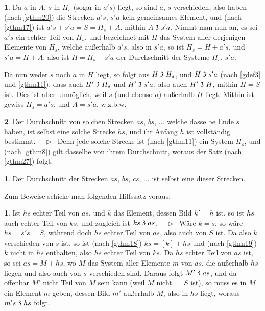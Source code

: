 \documentclass[leqno,hidelinks,10pt]{article}
\theoremstyle{definition}
\newtheorem{satz}{\protect\satzname}
\newtheorem*{zusatz}{\protect\zusatzname}
\newtheorem*{hilfssatz}{\protect\hilfssatzname}
\newcommand{\satzname}{}
\newcommand{\zusatzname}{}
\newcommand{\hilfssatzname}{}
\renewcommand{\satzname}{\hspace{-4pt}.\ Satz}%
\renewcommand{\zusatzname}{Zusatz}%
\renewcommand{\hilfssatzname}{Hilfssatz}%
\renewcommand{\satzname}{\hspace{-4pt}.\ Theorem}%
\renewcommand{\zusatzname}{Corollary}%
\renewcommand{\hilfssatzname}{Lemma}%
\newcommand\Beweis{\medskip \newline $ \phantom{'.'} \rhd \ $}%
\newcommand\TeilVon{\mathrel{\raisebox{0.45ex}{$\mathfrak{3}$}}}
\newcommand{\sref}[1]{\underline{\ref{#1}}}%
\begin{document}
\begin{paracol}{2}
\begin{leftcolumn}
\begin{satz}
Da $a$ in  $A$, $s$ in $H_s$ (sogar in $a's$) liegt, so sind $a$, $s$ verschieden,
also haben (nach \sref{gthm20}) die Strecken $a's$, $s'a$ kein gemeinsames Element,
und (nach \sref{gthm17}) ist  $a's + s'a = S = H_s + A$, mithin $A \TeilVon s'a$.
Nimmt man nun an, es sei $a's$ ein echter Teil von $H_s$, und bezeichnet mit $H$
das System aller derjenigen Elemente von $H_s$, welche außerhalb $a's$, also in
$s'a$, so ist $H_s = H + a's$, und $s'a = H + A$, also ist $H = H_s - s'a$ der
Durchschnitt der Systeme $H_s$, $s'a$.

Da nun weder $s$ noch $a$ in $H$ liegt, so folgt aus $H \TeilVon H_s$, und
$H \TeilVon s'a$ (nach \sref{gdef3} und \sref{gthm11}), dass auch $H' \TeilVon H_s$
und $H' \TeilVon s'a$, also auch $H' \TeilVon H$, mithin $H = S$ ist. Dies ist
aber unmöglich, weil $s$ (und ebenso $a$) außerhalb $H$ liegt. Mithin ist gewiss
$H_s= a's$, und $A = s'a$, w.z.b.w.
\end{satz}


\begin{satz}\label{gthm28}
Der Durchschnitt von solchen Strecken $as$, $bs$, $\ldots$ welche dasselbe Ende
$s$ haben, ist selbst eine solche Strecke $hs$, und ihr Anfang $h$ ist
vollständig bestimmt.
\Beweis
Denn jede solche Strecke ist (nach \sref{gthm11}) ein System $H_s$, und (nach \sref{gthm8})
gilt dasselbe von ihrem Durchschnitt, woraus der Satz (nach \sref{gthm27}) folgt.
\end{satz}

\begin{zusatz}\label{zusatz3}
Der Durchschnitt der Strecken $as$, $bs$, $cs$, ... ist selbst eine dieser Strecken.
\end{zusatz}

Zum Beweise schicke man folgenden Hilfssatz voraus:

\begin{hilfssatz}\label{hilfssatz1}
Ist $hs$ echter Teil von $as$, und $k$ das Element, dessen Bild $k' = h$ ist,
so ist $hs$ auch echter Teil von $ks$, und zugleich ist $ks \TeilVon as$.
\Beweis
Wäre $k = s$, so wäre $hs = s's = S$, während doch $hs$ echter Teil von $as$,
also auch von $S$ ist. Da also $k$ verschieden von $s$ ist, so ist (nach \sref{gthm18})
$ks = [k] + hs$ und (nach \sref{gthm19}) $k$ nicht in $hs$ enthalten, also $hs$
echter Teil von $ks$. Da $hs$ echter Teil von $as$ ist, so sei $as = M + hs$,
wo $M$ das System aller Elemente $m$ von $as$, die außerhalb $hs$ liegen und
also auch von $s$ verschieden sind. Daraus folgt $M' \TeilVon as$, und da
offenbar $M'$ nicht Teil von $M$ sein kann (weil $M$ nicht $= S$ ist), so
muss es in $M$ ein Element $m$ geben, dessen Bild $m'$ außerhalb $M$, also
in $hs$ liegt, woraus $m's \TeilVon hs$ folgt.
\end{hilfssatz}


\end{leftcolumn}
\end{paracol}
\end{document}
